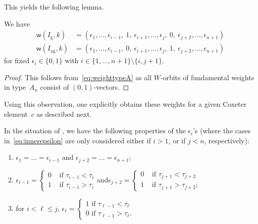 \documentclass[ALCO,Unicode,ThmDefs]{cedram}
\newcommand{\greedy}{I_{\operatorname{g}}}
\newcommand{\antigreedy}{I_{\operatorname{ag}}}
\newcommand{\sfw}{\mathsf{w}}
\newcommand{\Weight}[2]{{\sfw}(#1,#2)}
\begin{document}
This yields the following lemma.

\begin{lemm}\label{lem:greedyantigreedyweight}
We have
\begin{align}
\Weight{\greedy}{k} &= (\epsilon_1,\dots,\epsilon_{i-1},\ 1,\ \epsilon_{i+1},\dots,\epsilon_{j},\ 0,\ \epsilon_{j+2},\dots,\epsilon_{n+1}) \label{eq:greedyAn}
\\
\Weight{\antigreedy}{k} &= (\epsilon_1,\dots,\epsilon_{i-1},\ 0,\ \epsilon_{i+1},\dots,\epsilon_{j},\ 1,\ \epsilon_{j+2},\dots,\epsilon_{n+1}) \label{eq:antigreedyAn}
\end{align}
for fixed $\epsilon_i \in \{0,1\}$ with $i \in \{1,\dots,n+1\}\setminus\{i,j+1\}$.
\end{lemm}

\begin{proof}
This follows from~\eqref{eq:weighttypeA} as all $W$-orbits of fundamental weights in type~$A_n$ consist of $(0,1)$-vectors.
\end{proof}

Using this observation, one explicitly obtains these weights for a given Coxeter element~$c$ as described next.

\begin{prop}\label{prop:weightsAn}
In the situation of , we have the following properties of the $\epsilon_i$'s (where the cases in~\eqref{eq:innerepsilon} are only considered either if $i>1$, or if $j<n$, respectively):
\begin{enumerate}%
\item $\epsilon_1 = \dots = \epsilon_{i-1}$ and $\epsilon_{j+2} = \dots = \epsilon_{n+1}$;
\item\label{eq:innerepsilon}
$\epsilon_{i-1} =
\begin{cases}
0 &\text{ if } \tau_{i-1} < \tau_{i } \\
1 &\text{ if } \tau_{i-1} > \tau_{i }
\end{cases}$\quad and\quad $\epsilon_{j+2} =
\begin{cases}
0 &\text{ if }\tau_{j+1} < \tau_{j+2} \\
1 &\text{ if }\tau_{j+1} > \tau_{j+2};
\end{cases}$
\item\label{it:innerepsilon}
for $i<\ell\leq j$, $\epsilon_\ell =
\begin{cases}
1 \text{ if }\tau_{\ell-1} < \tau_\ell \\
0 \text{ if }\tau_{\ell-1} > \tau_\ell.
\end{cases}$
\end{enumerate}
\end{prop}
\end{document}
